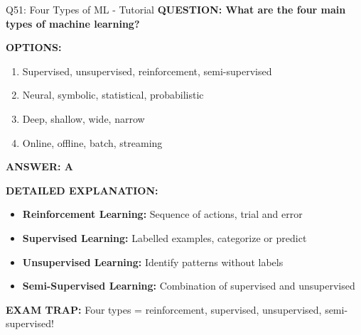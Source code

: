 \documentclass[8pt]{beamer}
\begin{document}
	\begin{frame}{Q51: Four Types of ML - Tutorial}
		\fontsize{6.5}{7.5}\selectfont
		\textbf{QUESTION: What are the four main types of machine learning?}
		
		\vspace{0.1cm}
		\textbf{OPTIONS:}
		\begin{enumerate}
			\item Supervised, unsupervised, reinforcement, semi-supervised
			\item Neural, symbolic, statistical, probabilistic
			\item Deep, shallow, wide, narrow
			\item Online, offline, batch, streaming
		\end{enumerate}
		
		\vspace{0.1cm}
		\textcolor{myblue}{\textbf{ANSWER: A}}
		
		\vspace{0.1cm}
		\textbf{DETAILED EXPLANATION:}
		\begin{itemize}
			\item \textbf{Reinforcement Learning:} Sequence of actions, trial and error
			\item \textbf{Supervised Learning:} Labelled examples, categorize or predict
			\item \textbf{Unsupervised Learning:} Identify patterns without labels
			\item \textbf{Semi-Supervised Learning:} Combination of supervised and unsupervised
		\end{itemize}
		
		\vspace{0.1cm}
		\textcolor{myred}{\textbf{EXAM TRAP:}} Four types = \textcolor{myblue}{reinforcement, supervised, unsupervised, semi-supervised}!
	\end{frame}
	
\end{document}
